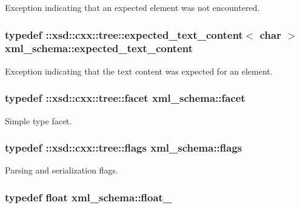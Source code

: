 Exception indicating that an expected element was not encountered. 

\hypertarget{namespacexml__schema_a1994323b3f5fee8db7891f02bb9144b9}{
\subsubsection[{expected\-\_\-text\-\_\-content}]{\setlength{\rightskip}{0pt plus 5cm}typedef \-::xsd\-::cxx\-::tree\-::expected\-\_\-text\-\_\-content$<$ char $>$ {\bf xml\-\_\-schema\-::expected\-\_\-text\-\_\-content}}}\label{namespacexml__schema_a1994323b3f5fee8db7891f02bb9144b9}


Exception indicating that the text content was expected for an element. 

\hypertarget{namespacexml__schema_ae447ddf0dd2470b5a095774e0b359a86}{
\subsubsection[{facet}]{\setlength{\rightskip}{0pt plus 5cm}typedef \-::xsd\-::cxx\-::tree\-::facet {\bf xml\-\_\-schema\-::facet}}}\label{namespacexml__schema_ae447ddf0dd2470b5a095774e0b359a86}


Simple type facet. 

\hypertarget{namespacexml__schema_a8d981c127a1f5106d04ad5853e707361}{
\subsubsection[{flags}]{\setlength{\rightskip}{0pt plus 5cm}typedef \-::xsd\-::cxx\-::tree\-::flags {\bf xml\-\_\-schema\-::flags}}}\label{namespacexml__schema_a8d981c127a1f5106d04ad5853e707361}


Parsing and serialization flags. 

\hypertarget{namespacexml__schema_ad7e04ab17bba0b3fdde43fb79ef6ed87}{
\subsubsection[{float\-\_\-}]{\setlength{\rightskip}{0pt plus 5cm}typedef float {\bf xml\-\_\-schema\-::float\-\_\-}}}\label{namespacexml__schema_ad7e04ab17bba0b3fdde43fb79ef6ed87}



